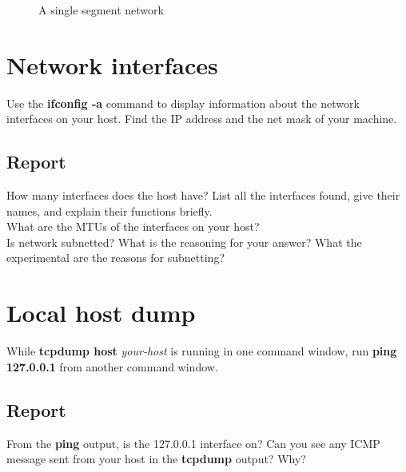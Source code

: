 \documentclass[10pt,a4paper]{article}
\numberwithin{equation}{section}
\numberwithin{figure}{section}
\numberwithin{table}{section}
\begin{document}
\begin{center}
\begin{minipage}{0.48\textwidth}
\begin{flushright}
\begin{figure}[H]
                    \caption{A single segment network}        
                \end{figure}
            \end{flushright}
        \end{minipage}
    \end{center}

\section{Network interfaces}
    Use the \textbf{ifconfig -a} command to display information about the network interfaces on your host.
    Find the IP address and the net mask of your machine.
    \subsection*{Report}

    How many interfaces does the host have?
    List all the interfaces found, give their names, and explain their functions briefly. \\
    What are the MTUs of the interfaces on your host? \\
    Is network subnetted?
    What is the reasoning for your answer? What the experimental are the reasons for subnetting?


\section{Local host dump}
    While \textbf{tcpdump host} \textit{your-host} is running in one command window, run \textbf{ping 127.0.0.1} from another command window.
    \subsection*{Report}
    From the \textbf{ping} output, is the 127.0.0.1 interface on?
    Can you see any ICMP message sent from your host in the \textbf{tcpdump} output?
    Why?
\end{document}
